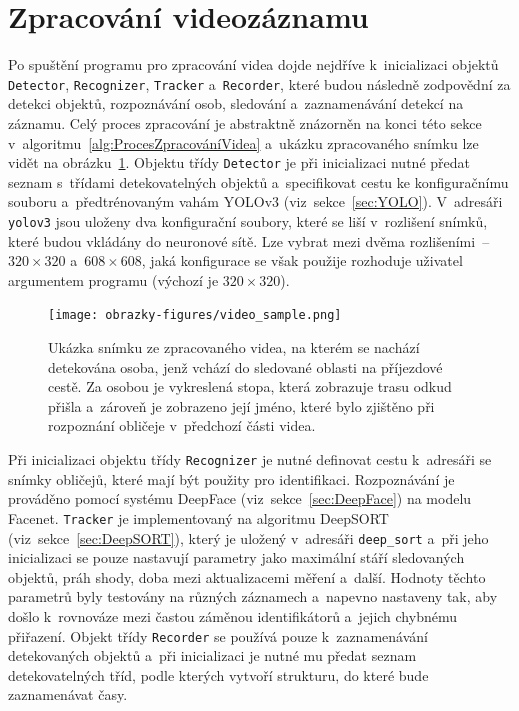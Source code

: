 \section{Zpracování videozáznamu}
Po spuštění programu pro zpracování videa dojde nejdříve k~inicializaci objektů \texttt{Detector}, \texttt{Recognizer}, \texttt{Tracker} a~\texttt{Recorder}, které budou následně zodpovědní za detekci objektů, rozpoznávání osob, sledování a~zaznamenávání detekcí na záznamu. Celý proces zpracování je abstraktně znázorněn na konci této sekce v~algoritmu~\ref{alg:ProcesZpracováníVidea} a~ukázku zpracovaného snímku lze vidět na obrázku~\ref{img:videoSample}. Objektu třídy \texttt{Detector} je při inicializaci nutné předat seznam s~třídami detekovatelných objektů a~specifikovat cestu ke konfiguračnímu souboru a~předtrénovaným vahám YOLOv3 (viz~sekce~\ref{sec:YOLO}). V~adresáři \texttt{yolov3} jsou uloženy dva konfigurační soubory, které se liší v~rozlišení snímků, které budou vkládány do neuronové sítě. Lze vybrat mezi dvěma rozlišeními~--~$320\times320$ a~$608\times608$, jaká konfigurace se však použije rozhoduje uživatel argumentem programu (výchozí je $320\times320$).

\begin{figure}[hbt]
	\centering
	\setlength{\fboxsep}{0pt}
	\texttt{[image: obrazky-figures/video\_sample.png]}
	\caption{Ukázka snímku ze zpracovaného videa, na kterém se nachází detekována osoba, jenž vchází do sledované oblasti na příjezdové cestě. Za osobou je vykreslená stopa, která zobrazuje trasu odkud přišla a~zároveň je zobrazeno její jméno, které bylo zjištěno při rozpoznání obličeje v~předchozí části videa.}
	\label{img:videoSample}
\end{figure}

Při inicializaci objektu třídy \texttt{Recognizer} je nutné definovat cestu k~adresáři se snímky obličejů, které mají být použity pro identifikaci. Rozpoznávání je prováděno pomocí systému DeepFace (viz~sekce~\ref{sec:DeepFace}) na modelu Facenet. \texttt{Tracker} je implementovaný na algoritmu DeepSORT (viz~sekce~\ref{sec:DeepSORT}), který je uložený v~adresáři \texttt{deep\_sort} a~při jeho inicializaci se pouze nastavují parametry jako maximální stáří sledovaných objektů, práh shody, doba mezi aktualizacemi měření a~další. Hodnoty těchto parametrů byly testovány na různých záznamech a~napevno nastaveny tak, aby došlo k~rovnováze mezi častou záměnou identifikátorů a~jejich chybnému přiřazení. Objekt třídy \texttt{Recorder} se používá pouze k~zaznamenávání detekovaných objektů a~při inicializaci je nutné mu předat seznam detekovatelných tříd, podle kterých vytvoří strukturu, do které bude zaznamenávat časy.

